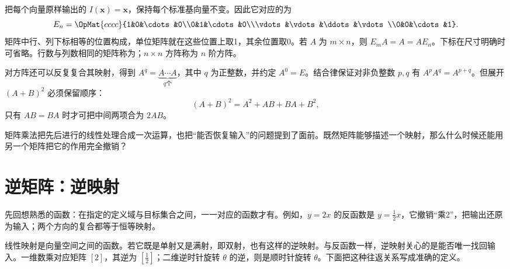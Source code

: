 \documentclass[a4paper,12pt,twoside,openany,fontset=none]{ctexbook}
\numberwithin{equation}{chapter}
\begin{document}
把每个向量原样输出的 $I(\boldsymbol x)=\boldsymbol x$，保持每个标准基向量不变。因此它对应的为
\[
 E_n=\OpMat{cccc}{1&0&\cdots&0\\0&1&\cdots&0\\\vdots&\vdots&\ddots&\vdots\\0&0&\cdots&1}.
\]
矩阵中行、列下标相等的位置构成，单位矩阵就在这些位置上取1，其余位置取0。若 $A$ 为 $m\times n$，则 $E_mA=A=AE_n$。下标在尺寸明确时可省略。行数与列数相同的矩阵称为；$n\times n$ 方阵称为 $n$ 阶方阵。

对方阵还可以反复复合其映射，得到 $A^q=\underbrace{A\cdots A}_{q\text{个}}$，其中 $q$ 为正整数，并约定 $A^0=E$。结合律保证对非负整数 $p,q$ 有 $A^pA^q=A^{p+q}$。但展开 $(A+B)^2$ 必须保留顺序：
\[
 (A+B)^2=A^2+AB+BA+B^2,
\]
只有 $AB=BA$ 时才可把中间两项合为 $2AB$。


矩阵乘法把先后进行的线性处理合成一次运算，也把“能否恢复输入”的问题提到了面前。既然矩阵能够描述一个映射，那么什么时候还能用另一个矩阵把它的作用完全撤销？

\section{逆矩阵：逆映射}
\label{sec:three-inverse}

先回想熟悉的函数：在指定的定义域与目标集合之间，一一对应的函数才有。例如，$y=2x$ 的反函数是 $y=\frac12x$，它撤销“乘2”，把输出还原为输入；两个方向的复合都等于恒等映射。

线性映射是向量空间之间的函数。若它既是单射又是满射，即双射，也有这样的逆映射。与反函数一样，逆映射关心的是能否唯一找回输入。一维数乘对应矩阵 $[2]$，其逆为 $[\frac12]$；二维逆时针旋转 $\theta$ 的逆，则是顺时针旋转 $\theta$。下面把这种往返关系写成准确的定义。
\end{document}
